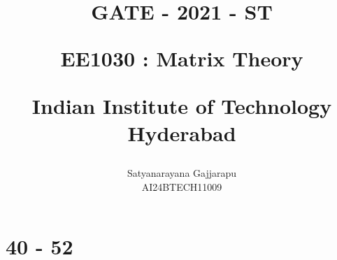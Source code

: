 \documentclass[journal]{IEEEtran}
\begin{document}

\vspace{3cm}




\title{
GATE - 2021 - ST

\large{EE1030 : Matrix Theory}

Indian Institute of Technology Hyderabad
}
\author{Satyanarayana Gajjarapu

AI24BTECH11009
}	





\maketitle




\bigskip

\renewcommand{\thefigure}{\theenumi}
\renewcommand{\thetable}{\theenumi}


\section{40 - 52}
\end{document}
